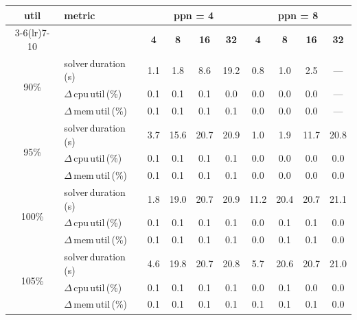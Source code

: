 \begin{tabular}{@{}c l *{8}{c}@{}}
\toprule
\multirow{2}{*}{\textbf{util}} & \multirow{2}{*}{\textbf{metric}} &\multicolumn{4}{c}{\textbf{ppn = 4}} & \multicolumn{4}{c}{\textbf{ppn = 8}}\\
\cmidrule(lr){3-6}\cmidrule(lr){7-10}
 &  & \textbf{4} & \textbf{8} & \textbf{16} & \textbf{32} & \textbf{4} & \textbf{8} & \textbf{16} & \textbf{32}\\
\midrule
\multirow{3}{*}{90\%}
& solver\,duration\,(s) & 1.1 & 1.8 & 8.6 & 19.2 & 0.8 & 1.0 & 2.5 & \multicolumn{1}{c}{—} \\
& $\Delta$\,cpu\,util\,(\%) & 0.1 & 0.1 & 0.1 & 0.0 & 0.0 & 0.0 & 0.0 & \multicolumn{1}{c}{—} \\
& $\Delta$\,mem\,util\,(\%) & 0.1 & 0.1 & 0.1 & 0.1 & 0.0 & 0.0 & 0.0 & \multicolumn{1}{c}{—} \\
\midrule
\multirow{3}{*}{95\%}
& solver\,duration\,(s) & 3.7 & 15.6 & 20.7 & 20.9 & 1.0 & 1.9 & 11.7 & 20.8 \\
& $\Delta$\,cpu\,util\,(\%) & 0.1 & 0.1 & 0.1 & 0.1 & 0.0 & 0.0 & 0.0 & 0.0 \\
& $\Delta$\,mem\,util\,(\%) & 0.1 & 0.1 & 0.1 & 0.1 & 0.0 & 0.0 & 0.0 & 0.0 \\
\midrule
\multirow{3}{*}{100\%}
& solver\,duration\,(s) & 1.8 & 19.0 & 20.7 & 20.9 & 11.2 & 20.4 & 20.7 & 21.1 \\
& $\Delta$\,cpu\,util\,(\%) & 0.1 & 0.1 & 0.1 & 0.1 & 0.0 & 0.1 & 0.1 & 0.0 \\
& $\Delta$\,mem\,util\,(\%) & 0.1 & 0.1 & 0.1 & 0.1 & 0.0 & 0.1 & 0.1 & 0.0 \\
\midrule
\multirow{3}{*}{105\%}
& solver\,duration\,(s) & 4.6 & 19.8 & 20.7 & 20.8 & 5.7 & 20.6 & 20.7 & 21.0 \\
& $\Delta$\,cpu\,util\,(\%) & 0.1 & 0.1 & 0.1 & 0.1 & 0.0 & 0.1 & 0.0 & 0.0 \\
& $\Delta$\,mem\,util\,(\%) & 0.1 & 0.1 & 0.1 & 0.1 & 0.1 & 0.1 & 0.1 & 0.0 \\
\bottomrule
\end{tabular}
